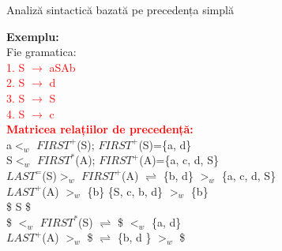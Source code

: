 \documentclass[pdf]{beamer}
\begin{document}
\begin{frame}{Analiză sintactică bazată pe precedența simplă}
\begin{table}
\centering
{}
\end{table}
\textcolor{ballblue}{\textbf{Exemplu:}}\\
Fie \textcolor{ballblue}{gramatica:}\\
\textcolor{red}{1. S $\rightarrow$ aSAb}\\
\textcolor{red}{2. S $\rightarrow$ d}\\
\textcolor{red}{3. S $\rightarrow$ S}\\
\textcolor{red}{4. S $\rightarrow$ c}\\
\textcolor{red}{\textbf{Matricea relațiilor de precedență:}}\\
a$<_{w}$ $FIRST^+$(S);    $FIRST^+$(S)=\{a, d\}\; \\
S$<_{w}$ $FIRST^*$(A);    $FIRST^+$(A)=\{a, c, d, S\}\; \\
$LAST^=$(S)$>_{w}$ $FIRST^+$(A) $\rightleftharpoons$ \{b, d\} $>_{w}$ \{a, c, d, S\}\;\\

$LAST^+$(A) $>_{w}$ \{b\}\; \hspace{2cm}   \{S, c, b, d\} $>_{w}$ \{b\}\; \\
\vspace{6mm}
\$ S \$ \\
\$ $<_{w}$ $FIRST^*$(S) \hspace{2cm}   $\rightleftharpoons$ \$ $<_{w}$ \{a, d\}\; \\
$LAST^+$(A) $>_{w}$ \$  \hspace{2cm}  $\rightleftharpoons$ \{b, d \} $>_{w}$ \$ \\
\end{frame}
\end{document}
